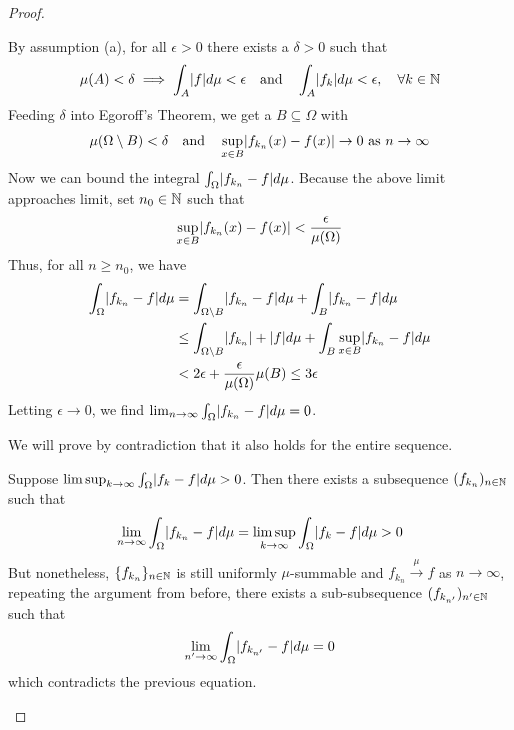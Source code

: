 \begin{proof}
\begin{itemize}
    By assumption (a), for all $\epsilon > 0$ there exists a $\delta > 0$ such that 
    \begin{align*}
      \mu(A) < \delta \implies \int_{A} \abs{f} d \mu < \epsilon \quad \text{and} \quad \int_{A} \abs{f_k} d \mu < \epsilon, \quad \forall k \in \N
    \end{align*}
    Feeding $\delta$ into Egoroff's Theorem, we get a $B \subseteq \Omega$ with
    \begin{align*}
      \mu(\Omega \setminus B) < \delta \quad \text{and} \quad \sup_{x \in B} \abs{f_{k_n}(x) - f(x)} \to 0 \text{ as } n \to \infty
    \end{align*}
    Now we can bound the integral $\int_{\Omega} \abs{f_{k_n} - f} d \mu$.
    Because the above limit approaches limit, set $n_0 \in \mathbb{N}$ such that
    \begin{align*}
      \sup_{x \in B} \abs{f_{k_n}(x) - f(x)} < \frac{\epsilon}{\mu(\Omega)}
    \end{align*}
    Thus, for all $n \geq n_0$, we have
    \begin{align*}
      \int_{\Omega} \abs{f_{k_n}-f} d \mu
      &=
      \int_{\Omega \setminus B} \abs{f_{k_n}-f} d \mu
      +
      \int_{B} \abs{f_{k_n}-f} d \mu
      \\
      &\leq
      \int_{\Omega \setminus B} \abs{f_{k_n}} + \abs{f} d \mu + 
      \int_{B} \sup_{x \in B} \abs{f_{k_n} - f} d \mu
      \\
      &< 2 \epsilon + \frac{\epsilon}{\mu(\Omega)} \mu(B) \leq 3 \epsilon
    \end{align*}
    Letting $\epsilon \to 0$, we find
    $
      \lim_{n \to \infty} \int_{\Omega} \abs{f_{k_n}-f} d \mu = 0
    $.

    We will prove by contradiction that it also holds for the entire sequence.

    Suppose $\limsup_{k \to \infty}\int_{\Omega} \abs{f_k -f} d \mu > 0$.
    Then there exists a subsequence $(f_{k_n})_{n \in \mathbb{N}}$ such that
    \begin{align*}
      \lim_{n \to \infty} \int_{\Omega} \abs{f_{k_n} - f} d \mu = \limsup_{k \to \infty} \int_{\Omega} \abs{f_k - f} d \mu > 0
    \end{align*}
    But nonetheless, $\{f_{k_n}\}_{n \in \mathbb{N}}$ is still uniformly $\mu$-summable and $f_{k_n} \stackrel{\mu}{\to} f$ as $n \to \infty$, repeating the argument from before, there exists a sub-subsequence $(f_{k_{n'}})_{n' \in \mathbb{N}}$ such that
    \begin{align*}
      \lim_{n' \to \infty} \int_{\Omega} \abs{f_{k_{n'}}-f} d \mu = 0
    \end{align*}
    which contradicts the previous equation.
\end{itemize}
\end{proof}

